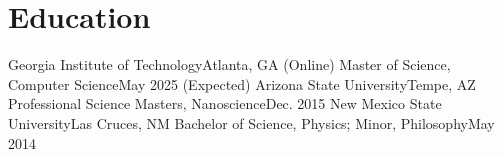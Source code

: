 \section{Education}
  \resumeSubHeadingListStart
    \resumeSubheading
      {Georgia Institute of Technology}{Atlanta, GA (Online)}
      {Master of Science, Computer Science}{May 2025 (Expected)}
      \resumeItemListStart
      \resumeItemListEnd
    \resumeSubheading
      {Arizona State University}{Tempe, AZ}
      {Professional Science Masters, Nanoscience}{Dec. 2015}
      \resumeItemListStart
      \resumeItemListEnd
    \resumeSubheading
      {New Mexico State University}{Las Cruces, NM}
      {Bachelor of Science, Physics; Minor, Philosophy}{May 2014}
      \resumeItemListStart
      \resumeItemListEnd
  \resumeSubHeadingListEnd
